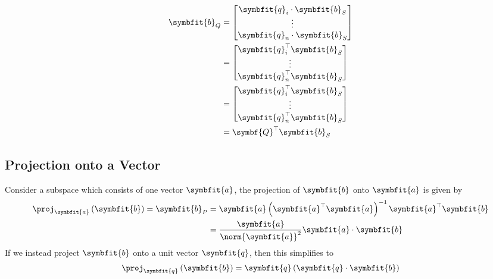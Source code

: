 \documentclass{article}
\begin{document}
\begin{align*}
    \symbfit{b}_Q & = \begin{bmatrix}
                          \symbfit{q}_i \cdot \symbfit{b}_S \\
                          \vdots                            \\
                          \symbfit{q}_n \cdot \symbfit{b}_S
                      \end{bmatrix} \\
                  & = \begin{bmatrix}
                          \symbfit{q}_i^\top \symbfit{b}_S \\
                          \vdots                           \\
                          \symbfit{q}_n^\top \symbfit{b}_S
                      \end{bmatrix}  \\
                  & = \begin{bmatrix}
                          \symbfit{q}_i^\top \symbfit{b}_S \\
                          \vdots                           \\
                          \symbfit{q}_n^\top \symbfit{b}_S
                      \end{bmatrix}  \\
                  & = \symbf{Q}^\top \symbfit{b}_S
\end{align*}
\subsection{Projection onto a Vector}
Consider a subspace which consists of one vector \(\symbfit{a}\), the projection of \(\symbfit{b}\)
onto \(\symbfit{a}\) is given by
\begin{align*}
    \proj_{\symbfit{a}} \left( \symbfit{b} \right) = \symbfit{b}_P & = \symbfit{a} \left( \symbfit{a}^\top \symbfit{a} \right)^{-1} \symbfit{a}^\top \symbfit{b} \\
                                                                   & = \frac{\symbfit{a}}{\norm{\symbfit{a}}^2} \symbfit{a} \cdot \symbfit{b}
\end{align*}
If we instead project \(\symbfit{b}\) onto a unit vector \(\symbfit{q}\), then this simplifies to
\begin{equation*}
    \proj_{\symbfit{q}} \left( \symbfit{b} \right) = \symbfit{q} \left( \symbfit{q} \cdot \symbfit{b} \right)
\end{equation*}
\end{document}
